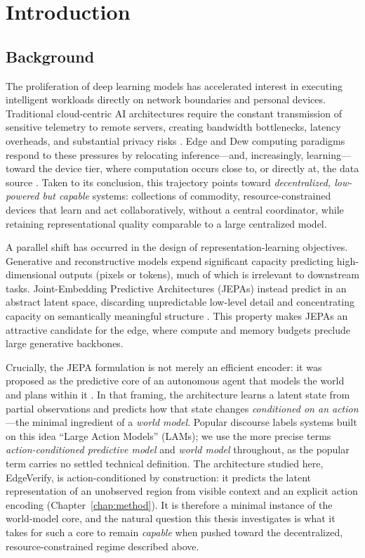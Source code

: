 \chapter{Introduction}
\label{chap:intro}

\section{Background}
The proliferation of deep learning models has accelerated interest in
executing intelligent workloads directly on network boundaries and
personal devices. Traditional cloud-centric AI architectures require the
constant transmission of sensitive telemetry to remote servers, creating
bandwidth bottlenecks, latency overheads, and substantial privacy risks
\cite{shi2016edge}. Edge and Dew computing paradigms respond to these
pressures by relocating inference---and, increasingly, learning---toward
the device tier, where computation occurs close to, or directly at, the
data source \cite{wang2016dew}. Taken to its conclusion, this trajectory
points toward \emph{decentralized, low-powered but capable} systems:
collections of commodity, resource-constrained devices that learn and act
collaboratively, without a central coordinator, while retaining
representational quality comparable to a large centralized model.

A parallel shift has occurred in the design of representation-learning
objectives. Generative and reconstructive models expend significant
capacity predicting high-dimensional outputs (pixels or tokens), much of
which is irrelevant to downstream tasks. Joint-Embedding Predictive
Architectures (JEPAs) instead predict in an abstract latent space,
discarding unpredictable low-level detail and concentrating capacity on
semantically meaningful structure \cite{lecun2022path, assran2023self}.
This property makes JEPAs an attractive candidate for the edge, where
compute and memory budgets preclude large generative backbones.

Crucially, the JEPA formulation is not merely an efficient encoder: it was
proposed as the predictive core of an autonomous agent that models the
world and plans within it \cite{lecun2022path}. In that framing, the
architecture learns a latent state from partial observations and predicts
how that state changes \emph{conditioned on an action}---the minimal
ingredient of a \emph{world model}. Popular discourse labels systems built
on this idea ``Large Action Models'' (LAMs); we use the more precise terms
\emph{action-conditioned predictive model} and \emph{world model}
throughout, as the popular term carries no settled technical definition.
The architecture studied here, EdgeVerify, is action-conditioned by
construction: it predicts the latent representation of an unobserved region
from visible context and an explicit action encoding (Chapter~\ref{chap:method}).
It is therefore a minimal instance of the world-model core, and the natural
question this thesis investigates is what it takes for such a core to remain
\emph{capable} when pushed toward the decentralized, resource-constrained
regime described above.

